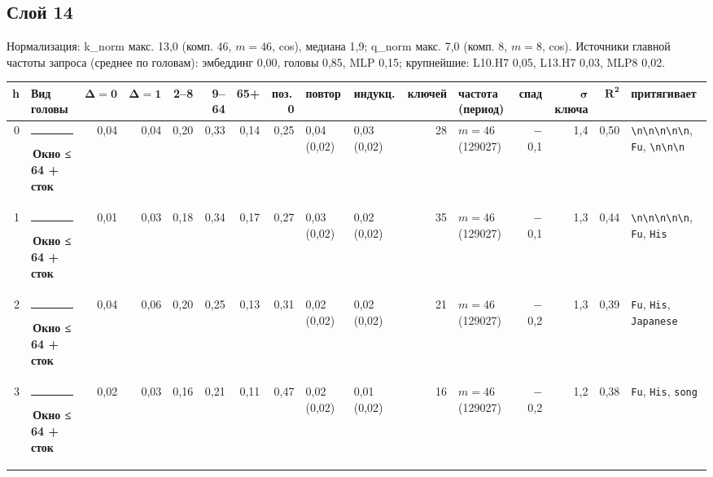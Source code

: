 \documentclass[10pt]{article}
\begin{document}
\noindent\begin{minipage}{\linewidth}
\subsection*{Слой 14}
{\small\color{ink2} Нормализация: k\_norm макс. 13,0 (комп. 46, $m{=}46$, cos), медиана 1,9; q\_norm макс. 7,0 (комп. 8, $m{=}8$, cos). Источники главной частоты запроса (среднее по головам): эмбеддинг 0,00, головы 0,85, MLP 0,15; крупнейшие: L10.H7 0,05, L13.H7 0,03, MLP8 0,02.}
\begin{center}{\footnotesize\begin{tabular}{|r|l|r|r|r|r|r|r|l|l|r|l|r|r|r|l|}
\hline
\rowcolor{head}\textbf{h} & \textbf{Вид головы} & $\boldsymbol{\Delta{=}0}$ & $\boldsymbol{\Delta{=}1}$ & \textbf{2–8} & \textbf{9–64} & \textbf{65+} & \textbf{поз.\,0} & \textbf{повтор} & \textbf{индукц.} & \textbf{ключей} & \textbf{частота (период)} & \textbf{спад} & $\boldsymbol{\sigma}$ \textbf{ключа} & $\boldsymbol{R^2}$ & \textbf{притягивает} \\ \hline
0 & \textcolor[HTML]{EDA100}{\rule{0.62em}{0.62em}}\,\textbf{Окно ≤ 64 + сток} & 0,04 & 0,04 & 0,20 & 0,33 & 0,14 & 0,25 & 0,04 (0,02) & 0,03 (0,02) & 28 & $m{=}46$ (129027) & $-$0,1 & 1,4 & 0,50 & \texttt{\textvisiblespace{}\textbackslash{}n\textbackslash{}n\textbackslash{}n\textbackslash{}n\textbackslash{}n}, \texttt{\textvisiblespace{}Fu}, \texttt{\textvisiblespace{}\textbackslash{}n\textbackslash{}n\textbackslash{}n} \\ \hline
1 & \textcolor[HTML]{EDA100}{\rule{0.62em}{0.62em}}\,\textbf{Окно ≤ 64 + сток} & 0,01 & 0,03 & 0,18 & 0,34 & 0,17 & 0,27 & 0,03 (0,02) & 0,02 (0,02) & 35 & $m{=}46$ (129027) & $-$0,1 & 1,3 & 0,44 & \texttt{\textvisiblespace{}\textbackslash{}n\textbackslash{}n\textbackslash{}n\textbackslash{}n\textbackslash{}n}, \texttt{\textvisiblespace{}Fu}, \texttt{\textvisiblespace{}His} \\ \hline
2 & \textcolor[HTML]{EDA100}{\rule{0.62em}{0.62em}}\,\textbf{Окно ≤ 64 + сток} & 0,04 & 0,06 & 0,20 & 0,25 & 0,13 & 0,31 & 0,02 (0,02) & 0,02 (0,02) & 21 & $m{=}46$ (129027) & $-$0,2 & 1,3 & 0,39 & \texttt{\textvisiblespace{}Fu}, \texttt{\textvisiblespace{}His}, \texttt{\textvisiblespace{}Japanese} \\ \hline
3 & \textcolor[HTML]{EDA100}{\rule{0.62em}{0.62em}}\,\textbf{Окно ≤ 64 + сток} & 0,02 & 0,03 & 0,16 & 0,21 & 0,11 & 0,47 & 0,02 (0,02) & 0,01 (0,02) & 16 & $m{=}46$ (129027) & $-$0,2 & 1,2 & 0,38 & \texttt{\textvisiblespace{}Fu}, \texttt{\textvisiblespace{}His}, \texttt{\textvisiblespace{}song} \\ \hline

\end{tabular}}
\end{center}
\end{minipage}
\end{document}
